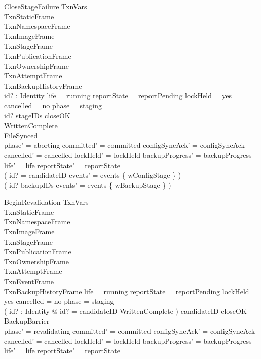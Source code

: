 \documentclass{article}
\begin{document}
\begin{schema}{CloseStageFailure}
	\Delta TxnVars \\
	TxnStaticFrame \\
	TxnNamespaceFrame \\
	TxnImageFrame \\
	TxnStageFrame \\
	TxnPublicationFrame \\
	TxnOwnershipFrame \\
	TxnAttemptFrame \\
	TxnBackupHistoryFrame \\
	id? : Identity
	\where
	life = running \land reportState = reportPending \land lockHeld = yes \land
	cancelled = no \land phase = staging \\
	id? \in stageIDs \setminus closeOK \\
	WrittenComplete \\
	FileSynced \\
	phase' = aborting \land committed' = committed \land
	configSyncAck' = configSyncAck \land cancelled' = cancelled \land
	lockHeld' = lockHeld \land backupProgress' = backupProgress \land
	life' = life \land reportState' = reportState \\
	( id? = candidateID \implies events' = events \cup \{ wConfigStage \} ) \\
	( id? \in backupIDs \implies events' = events \cup \{ wBackupStage \} )
\end{schema}

\begin{schema}{BeginRevalidation}
	\Delta TxnVars \\
	TxnStaticFrame \\
	TxnNamespaceFrame \\
	TxnImageFrame \\
	TxnStageFrame \\
	TxnPublicationFrame \\
	TxnOwnershipFrame \\
	TxnAttemptFrame \\
	TxnEventFrame \\
	TxnBackupHistoryFrame
	\where
	life = running \land reportState = reportPending \land lockHeld = yes \land
	cancelled = no \land phase = staging \\
	( \exists id? : Identity @
	id? = candidateID \land WrittenComplete ) \land
	candidateID \in closeOK \\
	BackupBarrier \\
	phase' = revalidating \land committed' = committed \land
	configSyncAck' = configSyncAck \land cancelled' = cancelled \land
	lockHeld' = lockHeld \land backupProgress' = backupProgress \land
	life' = life \land reportState' = reportState
\end{schema}
\end{document}
